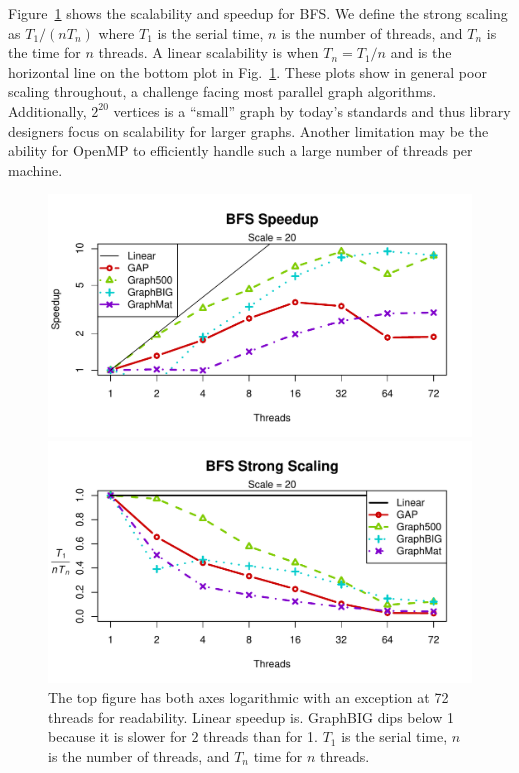 \documentclass[conference]{IEEEtran}
\begin{document}
Figure~\ref{fig:bfs-scaling} shows the scalability and speedup for BFS. We define the strong scaling as $T_1 / (n T_n)$ where $T_1$ is the serial time, $n$ is the number of threads, and $T_n$ is the time for $n$ threads. A linear scalability is when $T_n = T_1/n$ and is the horizontal line on the bottom plot in Fig.~\ref{fig:bfs-scaling}. These plots show in general poor scaling throughout, a challenge facing most parallel graph algorithms. Additionally, $2^{20}$ vertices is a ``small'' graph by today's standards and thus library designers focus on scalability for larger graphs. Another limitation may be the ability for OpenMP to efficiently handle such a large number of threads per machine.
\begin{figure}
	\centering
	\begin{minipage}{\linewidth}
		\includegraphics[width=\linewidth, trim=0 18pt 18pt 12pt, clip]{graphics/bfs_speedup.pdf}
	\end{minipage}
	\begin{minipage}{\linewidth}
		\includegraphics[width=\linewidth, trim=0 18pt 18pt 12pt, clip]{graphics/bfs_ss.pdf}
	\end{minipage}
	\caption{The top figure has both axes logarithmic with an exception at 72 threads for readability. Linear speedup is. GraphBIG dips below 1 because it is slower for $2$ threads than for 1. $T_1$ is the serial time, $n$ is the number of threads, and $T_n$ time for $n$ threads.}
	\label{fig:bfs-scaling}
\end{figure}
\end{document}
